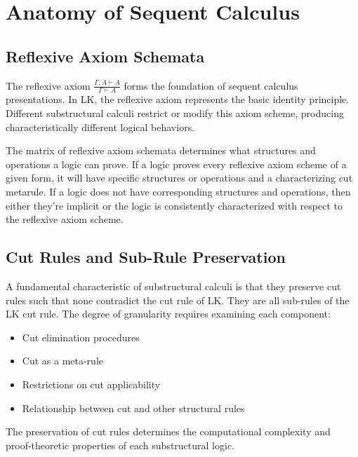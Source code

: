 
\chapter*{Anatomy of Sequent Calculus}

\section*{Reflexive Axiom Schemata}
The reflexive axiom $\frac{\Gamma, A \vdash A}{\Gamma \vdash A}$ forms the foundation of sequent calculus presentations. In LK, the reflexive axiom represents the basic identity principle. Different substructural calculi restrict or modify this axiom scheme, producing characteristically different logical behaviors.

The matrix of reflexive axiom schemata determines what structures and operations a logic can prove. If a logic proves every reflexive axiom scheme of a given form, it will have specific structures or operations and a characterizing cut metarule. If a logic does not have corresponding structures and operations, then either they're implicit or the logic is consistently characterized with respect to the reflexive axiom scheme.

\section*{Cut Rules and Sub-Rule Preservation}
A fundamental characteristic of substructural calculi is that they preserve cut rules such that none contradict the cut rule of LK. They are all sub-rules of the LK cut rule. The degree of granularity requires examining each component:

\begin{itemize}
    \item Cut elimination procedures
    \item Cut as a meta-rule
    \item Restrictions on cut applicability
    \item Relationship between cut and other structural rules
\end{itemize}

The preservation of cut rules determines the computational complexity and proof-theoretic properties of each substructural logic.

